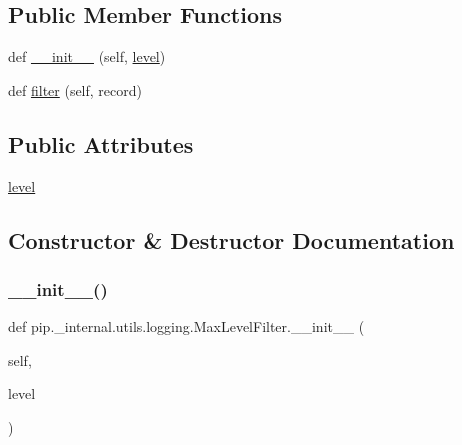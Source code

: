 \subsection*{Public Member Functions}
\begin{DoxyCompactItemize}
\item 
def \hyperlink{classpip_1_1__internal_1_1utils_1_1logging_1_1MaxLevelFilter_a9ffeb2dcd0f99ca2534d2fe76604c43f}{\+\_\+\+\_\+init\+\_\+\+\_\+} (self, \hyperlink{classpip_1_1__internal_1_1utils_1_1logging_1_1MaxLevelFilter_a552565a895c5261d511f1055eed2131f}{level})
\item 
def \hyperlink{classpip_1_1__internal_1_1utils_1_1logging_1_1MaxLevelFilter_a63dca7c95bc7850945669ee1bed73cb5}{filter} (self, record)
\end{DoxyCompactItemize}
\subsection*{Public Attributes}
\begin{DoxyCompactItemize}
\item 
\hyperlink{classpip_1_1__internal_1_1utils_1_1logging_1_1MaxLevelFilter_a552565a895c5261d511f1055eed2131f}{level}
\end{DoxyCompactItemize}


\subsection{Constructor \& Destructor Documentation}
\mbox{\label{classpip_1_1__internal_1_1utils_1_1logging_1_1MaxLevelFilter_a9ffeb2dcd0f99ca2534d2fe76604c43f}} 
\subsubsection{\texorpdfstring{\+\_\+\+\_\+init\+\_\+\+\_\+()}{\_\_init\_\_()}}
{\footnotesize\ttfamily def pip.\+\_\+internal.\+utils.\+logging.\+Max\+Level\+Filter.\+\_\+\+\_\+init\+\_\+\+\_\+ (\begin{DoxyParamCaption}\item[{}]{self,  }\item[{}]{level }\end{DoxyParamCaption})}




